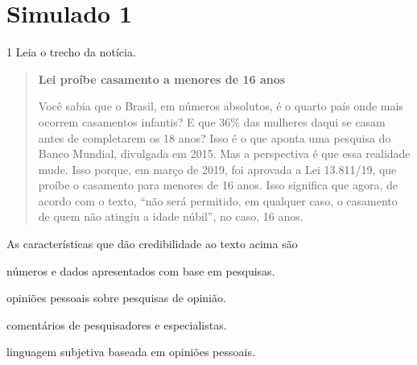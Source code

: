 
\chapter{Simulado 1}

\num{1} Leia o trecho da notícia.

\begin{quote}
\textbf{Lei proíbe casamento a menores de 16 anos}

Você sabia que o Brasil, em números absolutos, é o quarto país onde mais
ocorrem casamentos infantis? E que 36\% das mulheres daqui se casam
antes de completarem os 18 anos? Isso é o que aponta uma pesquisa do
Banco Mundial, divulgada em 2015. Mas a perspectiva é que essa realidade
mude. Isso porque, em março de 2019, foi aprovada a Lei 13.811/19, que
proíbe o casamento para menores de 16 anos. Isso significa que agora, de
acordo com o texto, ``não será permitido, em qualquer caso, o casamento
de quem não atingiu a idade núbil'', no caso, 16 anos.

\end{quote}

As características que dão credibilidade ao texto acima são

\begin{escolha}
\item números e dados apresentados com base em pesquisas.

\item opiniões pessoais sobre pesquisas de opinião.

\item comentários de pesquisadores e especialistas.

\item linguagem subjetiva baseada em opiniões pessoais.
\end{escolha}

